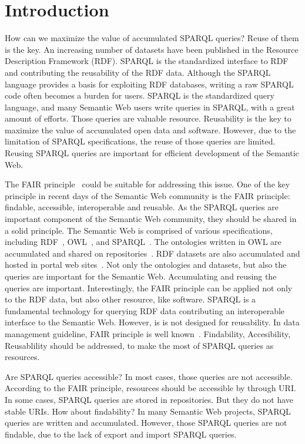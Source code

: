 \documentclass[runningheads]{llncs}
\begin{document}
\section{Introduction}

How can we maximize the value of accumulated SPARQL queries?
Reuse of them is the key.
An increasing number of datasets have been published in the Resource Description Framework (RDF).
SPARQL is the standardized interface to RDF and contributing the reusability of the RDF data. 
Although the SPARQL language provides a basis for exploiting RDF databases, writing a raw SPARQL code often becomes a burden for users. 
SPARQL is the standardized query language, and many Semantic Web users write queries in SPARQL, with a great amount of efforts.
Those queries are valuable resource.
Reusability is the key to maximize the value of accumulated open data and software.
However, due to the limitation of SPARQL specifications, the reuse of those queries are limited. 
Reusing SPARQL queries are important for efficient development of the Semantic Web.

The FAIR principle~\cite{fair} could be suitable for addressing this issue.
One of the key principle in recent days of the Semantic Web community is the FAIR principle: findable, accessible, interoperable and reusable.
As the SPARQL queries are important component of the Semantic Web community,
they should be shared in a solid principle.
The Semantic Web is comprised of various specifications, including RDF~\cite{rdf}, OWL~\cite{owl}, and SPARQL~\cite{sparql}. The ontologies written in OWL are accumulated and shared on repositories~\cite{bioportal}.
RDF datasets are also accumulated and hosted in portal web sites~\cite{rdf-portal}.
Not only the ontologies and datasets, but also the queries are important for the Semantic Web.
Accumulating and reusing the queries are important.
Interestingly, the FAIR principle can be applied not only to the RDF data, but also other resource, like software.
SPARQL is a fundamental technology for querying RDF data contributing an interoperable interface to the Semantic Web. However, is is not designed for reusability. 
In data management guideline, FAIR principle is well known~\cite{fair}. Findability, Accesibility, Reusablility should be addressed, to make the most of SPARQL queries as resources. 

Are SPARQL queries accessible? In most cases, those queries are not accessible. According to the FAIR principle, resources should be accessible by through URI. In some cases, SPARQL queries are stored in repositories. But they do not have stable URIs. How about findability? In many Semantic Web projects, SPARQL queries are written and accumulated. However, those SPARQL queries are not findable, due to the lack of export and import SPARQL queries.
\end{document}
